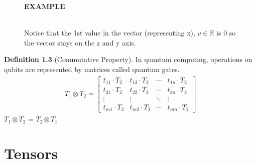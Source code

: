 \documentclass{report}
\begin{document}
\begin{figure}[h]
    \begin{tcolorbox}[colback=gray!10, boxrule=0pt] 
    \textbf{EXAMPLE} \\
    \\
        \centering
        \label{fig:vector_point}

    Notice that the 1st value in the vector (representing x), $v \in \mathbb{R}$ is 0 so the vector stays on the z and y axis.
    \end{tcolorbox}
\end{figure}

\noindent \textbf{Definition 1.3} (Commutative Property).
In quantum computing, operations on qubits are represented by matrices called quantum gates. 
\begin{align}
    T_1 \otimes T_2 = \begin{bmatrix}
    t_{11} \cdot T_2 & t_{12} \cdot T_2 & \cdots & t_{1n} \cdot T_2 \\
    t_{21} \cdot T_2 & t_{22} \cdot T_2 & \cdots & t_{2n} \cdot T_2 \\
    \vdots & \vdots & \ddots & \vdots \\
    t_{m1} \cdot T_2 & t_{m2} \cdot T_2 & \cdots & t_{mn} \cdot T_2
\end{bmatrix}
\end{align}
$T_1 \otimes T_2$ = $T_2 \otimes T_1$

\section{Tensors}
\section{}
\end{document}
